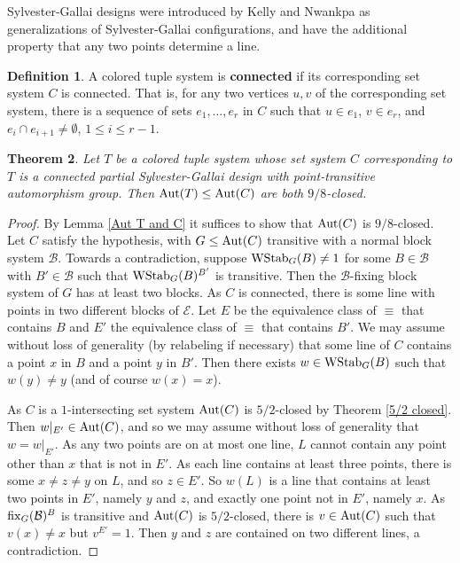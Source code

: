 \documentclass{amsart}
\newtheorem{thrm}{Theorem}[section]
\theoremstyle{definition}
\newtheorem{definition}[thrm]{Definition}
\theoremstyle{remark}
\numberwithin{equation}{section}
\def\fix{{\rm fix}}
\def\Aut{{\rm Aut}}
\def\cal{\mathcal}
\def\WStab{{\rm WStab}}
\begin{document}
Sylvester-Gallai designs were introduced by Kelly and Nwankpa \cite{KellyN1973} as generalizations of Sylvester-Gallai configurations, and have the additional property that any two points determine a line.

\begin{definition}
A colored tuple system is {\bf connected} if its corresponding set system $C$ is connected.  That is, for any two vertices $u,v$ of the corresponding set system, there is a sequence of sets $e_1,\ldots,e_r$ in $C$ such that $u\in e_1$, $v\in e_r$, and $e_i\cap e_{i + 1}\not = \emptyset$, $1\le i\le r-1$.
\end{definition}

\begin{thrm}\label{9/8 object}
Let $T$ be a colored tuple system whose set system $C$ corresponding to $T$ is a connected partial Sylvester-Gallai design with point-transitive automorphism group. Then $\Aut(T)\le\Aut(C)$ are both $9/8$-closed.
\end{thrm}

\begin{proof}
By Lemma \ref{Aut T and C} it suffices to show that $\Aut(C)$ is $9/8$-closed. Let $C$ satisfy the hypothesis, with $G\le\Aut(C)$ transitive with a normal block system ${\cal B}$.  Towards a contradiction, suppose $\WStab_G(B)\not = 1$ for some $B\in{\cal B}$ with $B'\in{\cal B}$ such that $\WStab_G(B)^{B'}$ is transitive.   Then the ${\cal B}$-fixing block system of $G$ has at least two blocks.  As $C$ is connected, there is some line with points in two different blocks of ${\cal E}$.   Let $E$ be the equivalence class of $\equiv$ that contains $B$ and $E'$ the equivalence class of $\equiv$ that contains $B'$.  We may assume without loss of generality (by relabeling if necessary) that some line of $C$ contains a point $x$ in $B$ and a point $y$ in $B'$.  Then there exists $w\in \WStab_G(B)$ such that $w(y)\not = y$ (and of course $w(x) = x$).

As $C$ is a $1$-intersecting set system $\Aut(C)$ is $5/2$-closed by Theorem \ref{5/2 closed}.  Then $w\vert_{E'}\in \Aut(C)$, and so we may assume without loss of generality that $w = w\vert_{E'}$.  As any two points are on at most one line, $L$ cannot contain any point other than $x$ that is not in $E'$.  As each line contains at least three points, there is some $x\not = z\not = y$ on $L$, and so $z\in E'$.  So $w(L)$ is a line that contains at least two points in $E'$, namely $y$ and $z$, and exactly one point not in $E'$, namely $x$.  As $\fix_G({\cal B})^B$ is transitive and $\Aut(C)$ is $5/2$-closed, there is $v\in\Aut(C)$ such that $v(x)\not = x$ but $v^{E'} = 1$.  Then $y$ and $z$ are contained on two different lines, a contradiction.
\end{proof}
\end{document}
